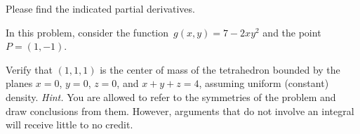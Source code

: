 \documentclass[12pt]{exam}
\begin{document}
\begin{questions}
    \question[16] Please find the indicated partial derivatives.



    \question In this problem, consider the function~$g(x,y) = 7 - 2xy^2$ and the point~$P = (1,-1)$. 


    \question[16] Verify that $(1,1,1)$ is the center of mass of the tetrahedron bounded by the planes $x = 0$, $y = 0$, $z = 0$, and $x + y + z = 4$, assuming uniform (constant) density. \emph{Hint.} You are allowed to refer to the symmetries of the problem and draw conclusions from them. However, arguments that do not involve an integral will receive little to no credit.


\end{questions}
\end{document}
